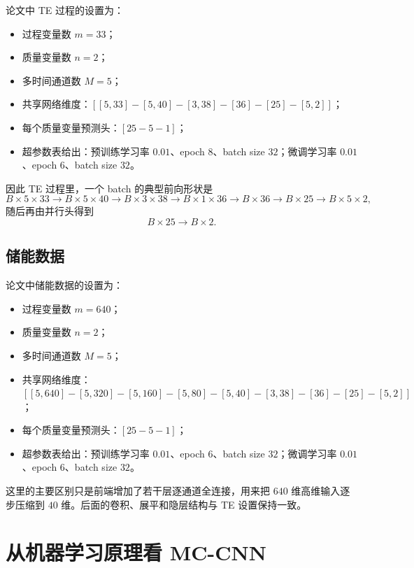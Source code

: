 \documentclass[UTF8]{ctexart}
\begin{document}
论文中 TE 过程的设置为：
\begin{itemize}
    \item 过程变量数 $m=33$；
    \item 质量变量数 $n=2$；
    \item 多时间通道数 $M=5$；
    \item 共享网络维度：$[[5,33]-[5,40]-[3,38]-[36]-[25]-[5,2]]$；
    \item 每个质量变量预测头：$[25-5-1]$；
    \item 超参数表给出：预训练学习率 $0.01$、epoch $8$、batch size $32$；微调学习率 $0.01$、epoch $6$、batch size $32$。
\end{itemize}

因此 TE 过程里，一个 batch 的典型前向形状是
\begin{equation}
    B \times 5 \times 33
    \to
    B \times 5 \times 40
    \to
    B \times 3 \times 38
    \to
    B \times 1 \times 36
    \to
    B \times 36
    \to
    B \times 25
    \to
    B \times 5 \times 2,
\end{equation}
随后再由并行头得到
\begin{equation}
    B \times 25 \to B \times 2.
\end{equation}

\subsection{储能数据}

论文中储能数据的设置为：
\begin{itemize}
    \item 过程变量数 $m=640$；
    \item 质量变量数 $n=2$；
    \item 多时间通道数 $M=5$；
    \item 共享网络维度：$[[5,640]-[5,320]-[5,160]-[5,80]-[5,40]-[3,38]-[36]-[25]-[5,2]]$；
    \item 每个质量变量预测头：$[25-5-1]$；
    \item 超参数表给出：预训练学习率 $0.01$、epoch $6$、batch size $32$；微调学习率 $0.01$、epoch $6$、batch size $32$。
\end{itemize}

这里的主要区别只是前端增加了若干层逐通道全连接，用来把 $640$ 维高维输入逐步压缩到 $40$ 维。后面的卷积、展平和隐层结构与 TE 设置保持一致。

\section{从机器学习原理看 MC-CNN}
\end{document}
